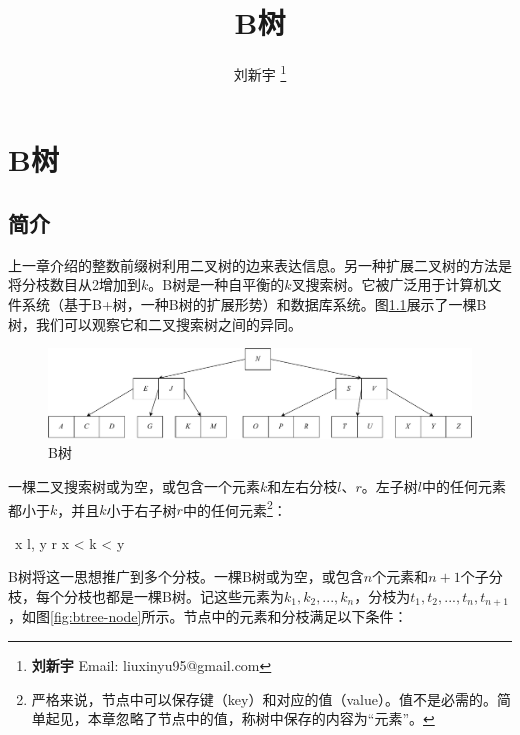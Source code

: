 \documentclass[b5paper]{ctexart}
\begin{document}
\title{B树}

\author{刘新宇
\thanks{{\bfseries 刘新宇 } \newline
  Email: liuxinyu95@gmail.com \newline}
  }

\maketitle
\fi


\ifx\wholebook\relax
\chapter{B树}
\fi

\section{简介}
\label{introduction}

上一章介绍的整数前缀树利用二叉树的边来表达信息。另一种扩展二叉树的方法是将分枝数目从2增加到$k$。B树是一种自平衡的$k$叉搜索树\cite{wiki-b-tree}。它被广泛用于计算机文件系统（基于B+树，一种B树的扩展形势）和数据库系统。图\ref{fig:btree-example}展示了一棵B树，我们可以观察它和二叉搜索树之间的异同。

\begin{figure}[htbp]
  \centering
  \includegraphics[scale=0.33]{img/btree-del-before}
  \caption{B树}
  \label{fig:btree-example}
\end{figure}

一棵二叉搜索树或为空，或包含一个元素$k$和左右分枝$l$、$r$。左子树$l$中的任何元素都小于$k$，并且$k$小于右子树$r$中的任何元素\footnote{严格来说，节点中可以保存键（key）和对应的值（value）。值不是必需的。简单起见，本章忽略了节点中的值，称树中保存的内容为“元素”。}：

\be
\forall\ x \in l, y \in r \Rightarrow x < k < y
\ee

B树将这一思想推广到多个分枝。一棵B树或为空，或包含$n$个元素和$n + 1$个子分枝，每个分枝也都是一棵B树。记这些元素为$k_1, k_2, ..., k_n$，分枝为$t_1, t_2, ..., t_n, t_{n+1}$，如图\ref{fig:btree-node}所示。节点中的元素和分枝满足以下条件：
\end{document}
